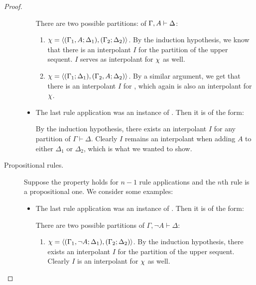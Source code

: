 \begin{proof}
\begin{description}
\begin{itemize}
					There are two possible partitions: of $\Gamma, A \vdash \Delta$:
					\begin{enumerate}
							\item $\chi =  \langle (\Gamma_1, A; \Delta_1), (\Gamma_2; \Delta_2)\rangle $.
								By the induction hypothesis, we know that there is an interpolant $I$ for the partition  of the upper sequent.
								$I$ serves as interpolant for $\chi$ as well.

							\item $\chi =  \langle (\Gamma_1; \Delta_1), (\Gamma_2, A; \Delta_2)\rangle $.
								By a similar argument, we get that there is an interpolant $I$ for 
, which again is also an interpolant for $\chi$.

					\end{enumerate}

				\item The last rule application was an instance of . Then it is of the form:
					\begin{prooftree}
						\Axiomm{\Gamma \fCenter \Delta}
					\end{prooftree}

					By the induction hypothesis, there exists an interpolant $I$ for any partition  of $\Gamma \vdash \Delta$.
					Clearly $I$ remains an interpolant when adding $A$ to either $\Delta_1$ or $\Delta_2$, which is what we wanted to show.

			\end{itemize}

		\item[\normalfont Propositional rules.]
			Suppose the property holds for $n-1$ rule applications and the $n$th rule is a propositional one.
			We consider some examples:

			\begin{itemize}
				\item The last rule application was an instance of . Then it is of the form:
					\begin{prooftree}
						\Axiomm{\Gamma \fCenter \Delta,  A}
						\RightLabelm{\lkrule{\lnot}{l}}
						\UnaryInfm{\Gamma, \lnot A \fCenter \Delta }
					\end{prooftree}

					There are two possible partitions of $\Gamma, \lnot A \vdash \Delta$:
					\begin{enumerate}
						\item $\chi =  \langle (\Gamma_1, \lnot A; \Delta_1), (\Gamma_2; \Delta_2)\rangle $.
							By the induction hypothesis, there exists an interpolant $I$ for the partition  of the upper sequent.
							Clearly $I$ is an interpolant for $\chi$ as well.


\end{enumerate}
\end{itemize}
\end{description}
\end{proof}
